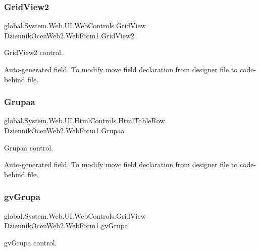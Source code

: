 \subsubsection{\texorpdfstring{Grid\+View2}{GridView2}}
{\footnotesize\ttfamily global.\+System.\+Web.\+U\+I.\+Web\+Controls.\+Grid\+View Dziennik\+Ocen\+Web2.\+Web\+Form1.\+Grid\+View2\hspace{0.3cm}{\ttfamily [protected]}}



Grid\+View2 control. 

Auto-\/generated field. To modify move field declaration from designer file to code-\/behind file. \mbox{\label{class_dziennik_ocen_web2_1_1_web_form1_a60e5d184ead042ff03cec6a6f956f9ba}} 
\subsubsection{\texorpdfstring{Grupaa}{Grupaa}}
{\footnotesize\ttfamily global.\+System.\+Web.\+U\+I.\+Html\+Controls.\+Html\+Table\+Row Dziennik\+Ocen\+Web2.\+Web\+Form1.\+Grupaa\hspace{0.3cm}{\ttfamily [protected]}}



Grupaa control. 

Auto-\/generated field. To modify move field declaration from designer file to code-\/behind file. \mbox{\label{class_dziennik_ocen_web2_1_1_web_form1_a0c2630436cb78a1aa9de889b4961ea4f}} 
\subsubsection{\texorpdfstring{gv\+Grupa}{gvGrupa}}
{\footnotesize\ttfamily global.\+System.\+Web.\+U\+I.\+Web\+Controls.\+Grid\+View Dziennik\+Ocen\+Web2.\+Web\+Form1.\+gv\+Grupa\hspace{0.3cm}{\ttfamily [protected]}}



gv\+Grupa control. 

